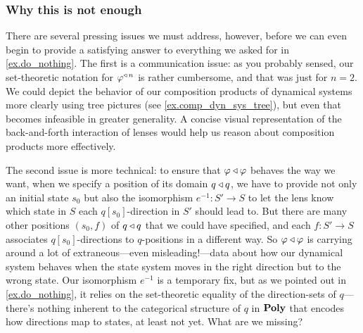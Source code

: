 \documentclass[Book-Poly]{subfiles}
\begin{document}
\subsubsection{Why this is not enough}\label{subsubsec.comon.comp.def.dyn_sys.issues}
There are several pressing issues we must address, however, before we can even begin to provide a satisfying answer to everything we asked for in \cref{ex.do_nothing}.
The first is a communication issue: as you probably sensed, our set-theoretic notation for $\varphi^{\mathbin{\triangleleft}\,n}$ is rather cumbersome, and that was just for $n=2$.
We could depict the behavior of our composition products of dynamical systems more clearly using tree pictures (see \cref{ex.comp_dyn_sys_tree}), but even that becomes infeasible in greater generality.
A concise visual representation of the back-and-forth interaction of lenses would help us reason about composition products more effectively.

The second issue is more technical: to ensure that $\varphi\mathbin{\triangleleft}\varphi$ behaves the way we want, when we specify a position of its domain $q\mathbin{\triangleleft} q$, we have to provide not only an initial state $s_0$ but also the isomorphism $e^{-1}\colon S'\to S$ to let the lens know which state in $S$ each $q[s_0]$-direction in $S'$ should lead to.
But there are many other positions $(s_0,f)$ of $q\mathbin{\triangleleft} q$ that we could have specified, and each $f\colon S'\to S$ associates $q[s_0]$-directions to $q$-positions in a different way.
So $\varphi\mathbin{\triangleleft}\varphi$ is carrying around a lot of extraneous---even misleading!---data about how our dynamical system behaves when the state system moves in the right direction but to the wrong state.
Our isomorphism $e^{-1}$ is a temporary fix, but as we pointed out in \cref{ex.do_nothing}, it relies on the set-theoretic equality of the direction-sets of $q$---there's nothing inherent to the categorical structure of $q$ in $\mathbf{Poly}$ that encodes how directions map to states, at least not yet.
What are we missing?
\end{document}
